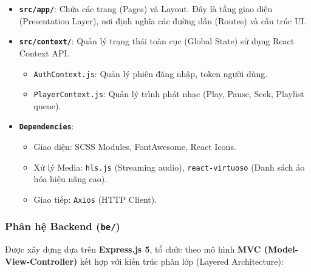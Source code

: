 \begin{itemize}
    \item \textbf{\texttt{src/app/}}: Chứa các trang (Pages) và Layout. Đây là tầng giao diện (Presentation Layer), nơi định nghĩa các đường dẫn (Routes) và cấu trúc UI.
    \item \textbf{\texttt{src/context/}}: Quản lý trạng thái toàn cục (Global State) sử dụng React Context API.
    \begin{itemize}
        \item \texttt{AuthContext.js}: Quản lý phiên đăng nhập, token người dùng.
        \item \texttt{PlayerContext.js}: Quản lý trình phát nhạc (Play, Pause, Seek, Playlist queue).
    \end{itemize}
    \item \textbf{\texttt{Dependencies}}:
    \begin{itemize}
        \item Giao diện: SCSS Modules, FontAwesome, React Icons.
        \item Xử lý Media: \texttt{hls.js} (Streaming audio), \texttt{react-virtuoso} (Danh sách ảo hóa hiệu năng cao).
        \item Giao tiếp: \texttt{Axios} (HTTP Client).
    \end{itemize}
\end{itemize}

\subsubsection{Phân hệ Backend (\texttt{be/})}
Được xây dựng dựa trên \textbf{Express.js 5}, tổ chức theo mô hình \textbf{MVC (Model-View-Controller)} kết hợp với kiến trúc phân lớp (Layered Architecture):

